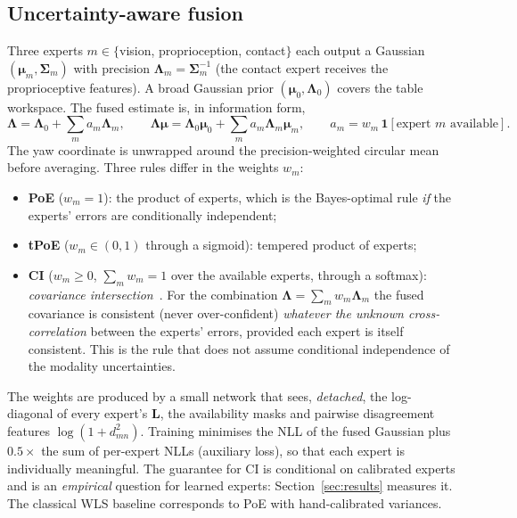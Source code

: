 \documentclass[11pt,a4paper]{article}
\newcommand{\vect}[1]{\bm{#1}}
\begin{document}
\subsection{Uncertainty-aware fusion}
\label{sec:uafusion}
Three experts $m\in\{$vision, proprioception, contact$\}$ each output a Gaussian $(\vect\mu_m,\vect\Sigma_m)$ with precision $\vect\Lambda_m=\vect\Sigma_m^{-1}$ (the contact expert receives the proprioceptive features). A broad Gaussian prior $(\vect\mu_0,\vect\Lambda_0)$ covers the table workspace. The fused estimate is, in information form,
\begin{equation}
\vect\Lambda=\vect\Lambda_0+\sum_m a_m\vect\Lambda_m,\qquad
\vect\Lambda\vect\mu=\vect\Lambda_0\vect\mu_0+\sum_m a_m\vect\Lambda_m\vect\mu_m,\qquad a_m=w_m\,\mathbf{1}[\text{expert }m\text{ available}].
\label{eq:fusion}
\end{equation}
The yaw coordinate is unwrapped around the precision-weighted circular mean before averaging. Three rules differ in the weights $w_m$:
\begin{itemize}
\item \textbf{PoE} ($w_m=1$): the product of experts, which is the Bayes-optimal rule \emph{if} the experts' errors are conditionally independent;
\item \textbf{tPoE} ($w_m\in(0,1)$ through a sigmoid): tempered product of experts;
\item \textbf{CI} ($w_m\ge0$, $\sum_m w_m=1$ over the available experts, through a softmax): \emph{covariance intersection}~\cite{julier1997non}. For the combination $\vect\Lambda=\sum_m w_m\vect\Lambda_m$ the fused covariance is consistent (never over-confident) \emph{whatever the unknown cross-correlation} between the experts' errors, provided each expert is itself consistent. This is the rule that does not assume conditional independence of the modality uncertainties.
\end{itemize}
The weights are produced by a small network that sees, \emph{detached}, the log-diagonal of every expert's $\vect L$, the availability masks and pairwise disagreement features $\log(1+d_{mn}^2)$. Training minimises the NLL of the fused Gaussian plus $0.5\times$ the sum of per-expert NLLs (auxiliary loss), so that each expert is individually meaningful. The guarantee for CI is conditional on calibrated experts and is an \emph{empirical} question for learned experts: Section~\ref{sec:results} measures it. The classical WLS baseline corresponds to PoE with hand-calibrated variances.

\end{document}
